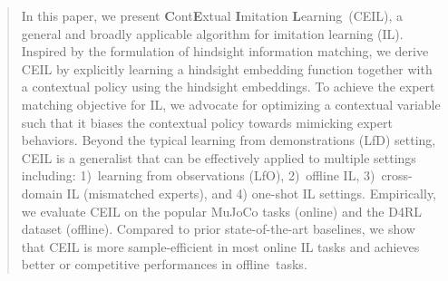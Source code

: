 


\begin{abstract}
In this paper, we present \textbf{C}ont\textbf{E}xtual \textbf{I}mitation \textbf{L}earning~(CEIL), a general and broadly applicable algorithm for imitation learning (IL). 
Inspired by the formulation of hindsight information matching, we derive CEIL by explicitly learning a hindsight embedding function together with a contextual policy using the hindsight embeddings. To achieve the expert matching objective for IL, we advocate for optimizing a contextual variable such that it biases the contextual policy towards mimicking expert behaviors. %
Beyond the typical learning from demonstrations (LfD) setting, CEIL is a generalist that can be effectively applied to multiple settings including: 1)~learning from observations (LfO), 2)~offline IL, 3)~cross-domain IL (mismatched experts), and 4) one-shot IL settings. 
Empirically, we evaluate CEIL on the popular MuJoCo tasks (online) and the D4RL dataset (offline). 
Compared to prior state-of-the-art baselines, we show that CEIL is more sample-efficient in most online IL tasks and achieves better or competitive performances in offline~tasks. 

\end{abstract}





